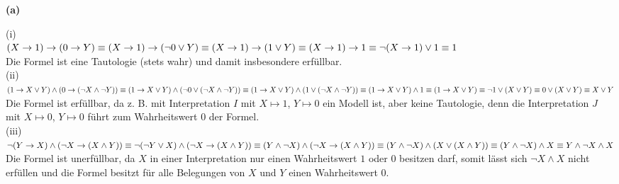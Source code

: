 \documentclass[11pt, a4paper]{article}
\begin{document}
\textbf{(a)}
\begin{adjustwidth}{20pt}{20pt}
(i)\\
 $(X\rightarrow 1)\rightarrow(0\rightarrow Y)\\ \equiv (X\rightarrow 1)\rightarrow(\neg 0\vee Y)\\ \equiv (X\rightarrow 1)\rightarrow(1 \vee Y)\\ \equiv (X\rightarrow 1)\rightarrow 1\\ \equiv \neg (X \rightarrow 1) \vee 1\equiv 1$\\

Die Formel ist eine Tautologie (stets wahr) und damit insbesondere erfüllbar.\\
(ii)\\
 $(1 \rightarrow X \vee Y) \wedge (0 \rightarrow (\neg X \wedge \neg Y))\\ \equiv (1 \rightarrow X \vee Y) \wedge (\neg 0 \vee (\neg X \wedge \neg Y))\\ \equiv (1 \rightarrow X \vee Y) \wedge (1 \vee (\neg X \wedge \neg Y))\\ \equiv (1 \rightarrow X \vee Y) \wedge 1 \equiv (1 \rightarrow X \vee Y)\\ \equiv \neg 1 \vee (X \vee Y) \equiv 0 \vee (X \vee Y) \equiv X \vee Y$\\

Die Formel ist erfüllbar, da z. B. mit Interpretation $I$ mit $X\mapsto 1$, $Y\mapsto 0$ ein Modell ist, aber keine Tautologie, denn die Interpretation $J$ mit $X\mapsto 0$, $Y\mapsto 0$ führt zum Wahrheitswert $0$ der Formel.\\
(iii)\\
 $\neg (Y \rightarrow X)\wedge(\neg X \rightarrow (X \wedge Y))\\ \equiv \neg (\neg Y \vee X)\wedge(\neg X \rightarrow (X \wedge Y))\\ \equiv ( Y \wedge \neg X)\wedge(\neg X \rightarrow (X \wedge Y))\\ \equiv ( Y \wedge \neg X)\wedge( X \vee (X \wedge Y))\\ \equiv ( Y \wedge \neg X)\wedge X \equiv Y \wedge \neg X \wedge X$\\

Die Formel ist unerfüllbar, da $X$ in einer Interpretation nur einen Wahrheitswert $1$ oder $0$ besitzen darf, somit lässt sich $\neg X \wedge X$ nicht erfüllen und die Formel besitzt für alle Belegungen von $X$ und $Y$ einen Wahrheitswert $0$.

\end{adjustwidth}
\end{document}
